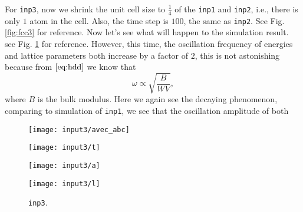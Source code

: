 For \texttt{inp3}, now we shrink the unit cell size to $\frac{ 1 }{ 4 }$ of the
\texttt{inp1} and \texttt{inp2}, i.e., there is only $1$  atom in the 
cell. Also, the time step is $100$, the same as \texttt{inp2}.
See Fig. \ref{fig:fcc3} for reference.
Now let's see what will happen to the simulation result. see Fig. \ref{fig:input3}
for reference.
However, this time, the oscillation frequency of energies and lattice parameters
both increase by a factor of $2$, this is not astonishing because from 
$\eqref{eq:hdd}$ we know that 
\begin{equation}
  \omega \propto \sqrt{ 
 \frac{ B }{ W V } 
 },
\end{equation}
where $B$ is the bulk modulus.
Here we again see the decaying phenomenon,
comparing to simulation of \texttt{inp1}, we see that the oscillation amplitude of
both 
\begin{figure}[h]
  \begin{minipage}[t]{0.45\textwidth}
    \texttt{[image: input3/avec\_abc]}
    \subcaption{}
    \label{fig:input3:avec_abc}
  \end{minipage}
  \hfil
  \begin{minipage}[t]{0.45\textwidth}
    \texttt{[image: input3/t]}
    \subcaption{}
    \label{fig:input3:t}
  \end{minipage}
  \hfil
  \vfill
  \begin{minipage}[t]{0.45\textwidth}
    \texttt{[image: input3/a]}
    \subcaption{}
    \label{fig:input3:a}
  \end{minipage}
  \hfil
  \begin{minipage}[t]{0.45\textwidth}
    \texttt{[image: input3/l]}
    \subcaption{}
    \label{fig:input3:l}
  \end{minipage}
  \caption{\texttt{inp3}.}
  \label{fig:input3}
\end{figure}

